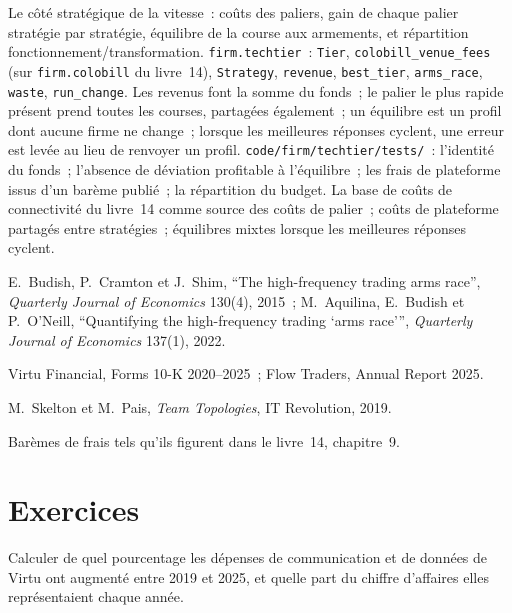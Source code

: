 \begin{build}
 Le côté stratégique de la vitesse~: coûts des paliers, gain de chaque palier stratégie par stratégie, équilibre de la course aux armements, et répartition
fonctionnement/transformation.
 \texttt{firm.techtier}~: \texttt{Tier}, \texttt{colobill\_venue\_fees} (sur \texttt{firm.colobill} du livre~14), \texttt{Strategy},
\texttt{revenue}, \texttt{best\_tier}, \texttt{arms\_race}, \texttt{waste}, \texttt{run\_change}.
 Les revenus font la somme du fonds~; le palier le plus rapide présent prend toutes les courses, partagées également~; un équilibre est un profil dont aucune firme ne change~;
lorsque les meilleures réponses cyclent, une erreur est levée au lieu de renvoyer un profil.
 \texttt{code/firm/techtier/tests/}~: l'identité du fonds~; l'absence de déviation profitable à l'équilibre~; les frais de plateforme issus d'un barème
publié~; la répartition du budget.
 La base de coûts de connectivité du livre~14 comme source des coûts de palier~; coûts de plateforme partagés entre stratégies~; équilibres mixtes lorsque les
meilleures réponses cyclent.
\end{build}

\begin{omsources}
\item E.~Budish, P.~Cramton et J.~Shim, ``The high-frequency trading arms race'', \emph{Quarterly Journal of Economics} 130(4), 2015~;
M.~Aquilina, E.~Budish et P.~O'Neill, ``Quantifying the high-frequency trading `arms race''', \emph{Quarterly Journal of Economics} 137(1), 2022.
\item Virtu Financial, Forms 10-K 2020--2025~; Flow Traders, Annual Report 2025.
\item M.~Skelton et M.~Pais, \emph{Team Topologies}, IT Revolution, 2019.
\item Barèmes de frais tels qu'ils figurent dans le livre~14, chapitre~9.
\end{omsources}

\section{Exercices}

\begin{exercise}[$\star$]\label{exo:fm:technology-strategy:1}
Calculer de quel pourcentage les dépenses de communication et de données de Virtu ont augmenté entre 2019 et 2025, et quelle part du chiffre d'affaires elles représentaient chaque année.
\end{exercise}

